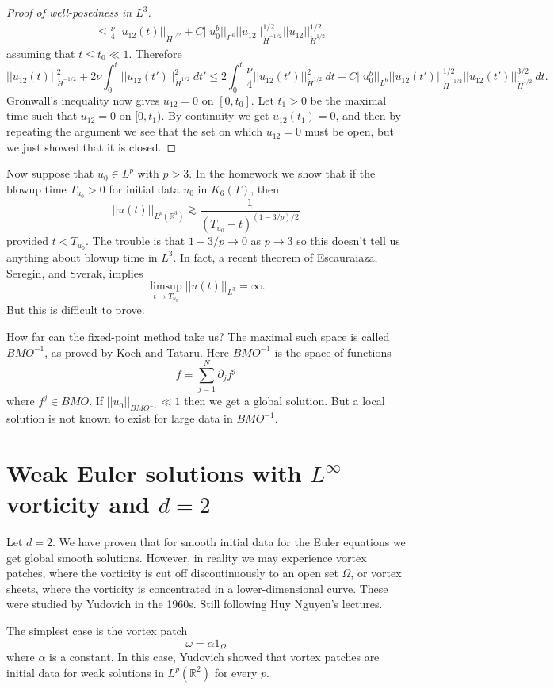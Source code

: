\documentclass[12pt]{book}
\newcommand{\RR}{\mathbb{R}}
\theoremstyle{definition}
\begin{document}
\begin{proof}[Proof of well-posedness in $L^3$]
\begin{align*}
&\leq \frac{\nu}{4} ||u_{12}(t)||_{\dot H^{1/2}} + C||u_0^b||_{L^6} ||u_{12}||_{\dot H^{-1/2}}^{1/2} ||u_{12}||_{\dot H^{1/2}}^{1/2}
\end{align*}
assuming that $t \leq t_0 \ll 1$. Therefore
$$||u_{12}(t)||_{\dot H^{-1/2}}^2 + 2\nu \int_0^t ||u_{12}(t')||_{\dot H^{1/2}}^2 ~dt' \leq 2\int_0^t \frac{\nu}{4} ||u_{12}(t')||_{\dot H^{1/2}}^2 ~dt + C||u_0^b||_{L^6}||u_{12}(t')||_{\dot H^{-1/2}}^{1/2} ||u_{12}(t')||_{\dot H^{1/2}}^{3/2} ~dt.$$
Gr\"onwall's inequality now gives $u_{12} = 0$ on $[0, t_0]$.
Let $t_1 > 0$ be the maximal time such that $u_{12} = 0$ on $[0, t_1)$.
By continuity we get $u_{12}(t_1) = 0$, and then by repeating the argument we see that the set on which $u_{12} = 0$ must be open, but we just showed that it is closed.
\end{proof}

Now suppose that $u_0 \in L^p$ with $p > 3$.
In the homework we show that if the blowup time $T_{u_0} > 0$ for initial data $u_0$ in $K_6(T)$, then
$$||u(t)||_{L^p(\RR^3)} \gtrsim \frac{1}{(T_{u_0} - t)^{(1 - 3/p)/2}}$$
provided $t < T_{u_0}$.
The trouble is that $1-3/p \to 0$ as $p \to 3$ so this doesn't tell us anything about blowup time in $L^3$. In fact, a recent theorem of Escauraiaza, Seregin, and Sverak, implies
$$\limsup_{t \to T_{u_0}} ||u(t)||_{L^3} = \infty.$$
But this is difficult to prove.

How far can the fixed-point method take us?
The maximal such space is called $BMO^{-1}$, as proved by Koch and Tataru.
Here $BMO^{-1}$ is the space of functions
$$f = \sum_{j=1}^N \partial_j f^j$$
where $f^j \in BMO$.
If $||u_0||_{BMO^{-1}} \ll 1$ then we get a global solution.
But a local solution is not known to exist for large data in $BMO^{-1}$.

\chapter{Weak Euler solutions with $L^\infty$ vorticity and $d = 2$}
Let $d = 2$.
We have proven that for smooth initial data for the Euler equations we get global smooth solutions.
However, in reality we may experience vortex patches, where the vorticity is cut off discontinuously to an open set $\Omega$, or vortex sheets, where the vorticity is concentrated in a lower-dimensional curve.
These were studied by Yudovich in the 1960s.
Still following Huy Nguyen's lectures.

The simplest case is the vortex patch
$$\omega = \alpha 1_\Omega$$
where $\alpha$ is a constant. In this case, Yudovich showed that vortex patches are initial data for weak solutions in $L^p(\RR^2)$ for every $p$.
\end{document}
